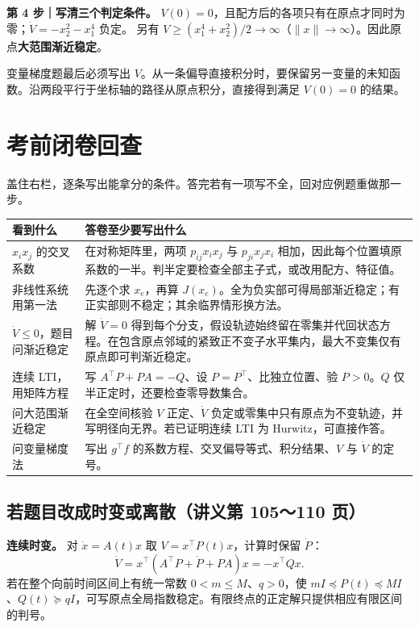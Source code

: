 \documentclass[UTF8,a4paper,11pt,fontset=fandol]{ctexart}
\begin{document}
\textbf{第 4 步｜写清三个判定条件。}
$V(0)=0$，且配方后的各项只有在原点才同时为零；$\dot V=-x_2^2-x_1^4$ 负定。
另有 $V\ge(x_1^4+x_2^2)/2\to\infty$（$\|x\|\to\infty$）。因此原点\textbf{大范围渐近稳定}。

\begin{keybox}
变量梯度题最后必须写出 $V$。从一条偏导直接积分时，要保留另一变量的未知函数。沿两段平行于坐标轴的路径从原点积分，直接得到满足 $V(0)=0$ 的结果。
\end{keybox}

\newpage
\section{考前闭卷回查}\label{sec:final}

盖住右栏，逐条写出能拿分的条件。答完若有一项写不全，回对应例题重做那一步。

\begingroup
\setlength{\extrarowheight}{6pt}
\begin{tabularx}{\linewidth}{@{}>{\raggedright\arraybackslash}p{43mm}>{\raggedright\arraybackslash}X@{}}
\toprule
\textbf{看到什么} & \textbf{答卷至少要写出什么}\\
\midrule
$x_i x_j$ 的交叉系数 & 在对称矩阵里，两项 $p_{ij}x_ix_j$ 与 $p_{ji}x_jx_i$ 相加，因此每个位置填原系数的一半。判半定要检查全部主子式，或改用配方、特征值。\\
非线性系统用第一法 & 先逐个求 $x_e$，再算 $J(x_e)$。全为负实部可得局部渐近稳定；有正实部则不稳定；其余临界情形换方法。\\
$\dot V\le0$，题目问渐近稳定 & 解 $\dot V=0$ 得到每个分支，假设轨迹始终留在零集并代回状态方程。在包含原点邻域的紧致正不变子水平集内，最大不变集仅有原点即可判渐近稳定。\\
连续 LTI，用矩阵方程 & 写 $A^\top P+PA=-Q$、设 $P=P^\top$、比独立位置、验 $P>0$。$Q$ 仅半正定时，还要检查零导数集合。\\
问大范围渐近稳定 & 在全空间核验 $V$ 正定、$\dot V$ 负定或零集中只有原点为不变轨迹，并写明径向无界。若已证明连续 LTI 为 Hurwitz，可直接作答。\\
问变量梯度法 & 写出 $g^\top f$ 的系数方程、交叉偏导等式、积分结果、$V$ 与 $\dot V$ 的定号。\\
\bottomrule
\end{tabularx}
\endgroup

\subsection*{若题目改成时变或离散（讲义第 105～110 页）}
\textbf{连续时变。} 对 $\dot x=A(t)x$ 取 $V=x^\top P(t)x$，计算时保留 $\dot P$：
\[
 \dot V=x^\top(A^\top P+\dot P+PA)x=-x^\top Qx .
\]
若在整个向前时间区间上有统一常数 $0<m\le M$、$q>0$，使 $mI\preceq P(t)\preceq MI$、$Q(t)\succeq qI$，可写原点全局指数稳定。有限终点的正定解只提供相应有限区间的判号。
\end{document}
